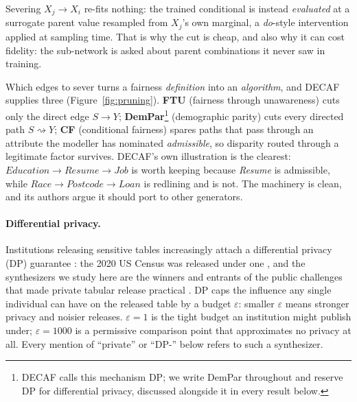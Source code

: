 \documentclass[manuscript,screen,review]{acmart}
\begin{document}
Severing $X_j \rightarrow X_i$ re-fits nothing: the trained conditional is
instead \emph{evaluated} at a surrogate parent value resampled from $X_j$'s
own marginal, a \emph{do}-style intervention applied at sampling time. That is
why the cut is cheap, and also why it can cost fidelity: the sub-network is
asked about parent combinations it never saw in training.

Which edges to sever turns a fairness \emph{definition} into an
\emph{algorithm}, and DECAF supplies three (Figure~\ref{fig:pruning}).
\textbf{FTU} (fairness through unawareness) cuts only the direct edge $S
\rightarrow Y$; \textbf{DemPar}\footnote{DECAF calls this mechanism DP; we
write DemPar throughout and reserve DP for differential privacy, discussed
alongside it in every result below.} (demographic parity) cuts every directed
path $S \rightsquigarrow Y$; \textbf{CF} (conditional fairness) spares paths
that pass through an attribute the modeller has nominated \emph{admissible},
so disparity routed through a legitimate factor survives. DECAF's own
illustration is the clearest: $\textit{Education} \rightarrow \textit{Resume}
\rightarrow \textit{Job}$ is worth keeping because \textit{Resume} is
admissible, while $\textit{Race} \rightarrow \textit{Postcode} \rightarrow
\textit{Loan}$ is redlining and is not. The machinery is clean, and its
authors argue it should port to other generators.

\paragraph{Differential privacy.}
Institutions releasing sensitive tables increasingly attach a differential
privacy (DP) guarantee \citep{dwork2006calibrating}: the 2020 US Census was
released under one \citep{abowd2022topdown}, and the synthesizers we study
here are the winners and entrants of the public challenges that made private
tabular release practical \citep{nist2018challenge,mckenna2021mst,vos2024}.
DP caps the influence any single individual can have on the released table by
a budget $\varepsilon$: smaller $\varepsilon$ means stronger privacy and
noisier releases. $\varepsilon{=}1$ is the tight budget an institution might
publish under; $\varepsilon{=}1000$ is a permissive comparison point that
approximates no privacy at all. Every mention of ``private'' or ``DP-''
below refers to such a synthesizer.
\end{document}
